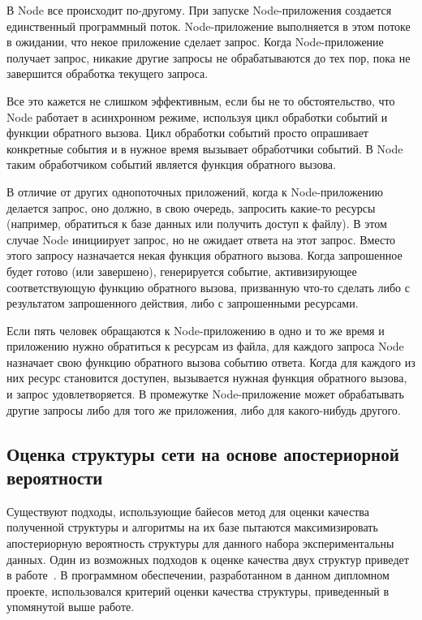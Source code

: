 В Node все происходит по-другому. При запуске Node-приложения создается единственный программный поток. Node-приложение выполняется в этом потоке в ожидании, что некое приложение сделает запрос. Когда Node-приложение получает запрос, никакие другие запросы не обрабатываются до тех пор, пока не завершится обработка текущего запроса.

Все это кажется не слишком эффективным, если бы не то обстоятельство, что Node работает в асинхронном режиме, используя цикл обработки событий и функции обратного вызова. Цикл обработки событий просто опрашивает конкретные события и в нужное время вызывает обработчики событий. В Node таким обработчиком событий является функция обратного вызова.

В отличие от других однопоточных приложений, когда к Node-приложению делается запрос, оно должно, в свою очередь, запросить какие-то ресурсы (например, обратиться к базе данных или получить доступ к файлу). В этом случае Node инициирует запрос, но не ожидает ответа на этот запрос. Вместо этого запросу назначается некая функция обратного вызова. Когда запрошенное будет готово (или завершено), генерируется событие, активизирующее соответствующую функцию обратного вызова, призванную что-то сделать либо с результатом запрошенного действия, либо с запрошенными ресурсами.

Если пять человек обращаются к Node-приложению в одно и то же время и приложению нужно обратиться к ресурсам из файла, для каждого запроса Node назначает свою функцию обратного вызова событию ответа. Когда для каждого из них ресурс становится доступен, вызывается нужная функция обратного вызова, и запрос удовлетворяется. В промежутке Node-приложение может обрабатывать другие запросы либо для того же приложения, либо для какого-нибудь  другого.



\subsection{Оценка структуры сети на основе апостериорной вероятности}
\label{sub:domain:k2_algo}
Существуют подходы, использующие байесов метод для оценки качества полученной структуры и алгоритмы на их базе пытаются максимизировать апостериорную вероятность структуры для данного набора экспериментальны данных.
Один из возможных подходов к оценке качества двух структур приведет в работе~\cite{Cooper1991}.
В программном обеспечении, разработанном в данном дипломном проекте, использовался критерий оценки качества структуры, приведенный в упомянутой выше работе.

